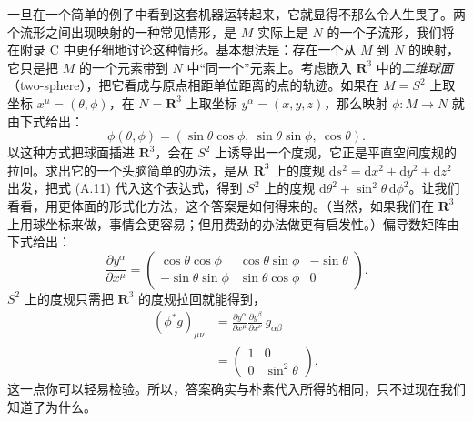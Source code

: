 
一旦在一个简单的例子中看到这套机器运转起来，它就显得不那么令人生畏了。两个流形之间出现映射的一种常见情形，是 $M$ 实际上是 $N$ 的一个子流形，我们将在附录 C 中更仔细地讨论这种情形。基本想法是：存在一个从 $M$ 到 $N$ 的映射，它只是把 $M$ 的一个元素带到 $N$ 中“同一个”元素上。考虑嵌入 $\mathbf{R}^{3}$ 中的\emph{二维球面}（two-sphere），把它看成与原点相距单位距离的点的轨迹。如果在 $M = S^{2}$ 上取坐标 $x^{\mu} = (\theta,\phi)$，在 $N = \mathbf{R}^{3}$ 上取坐标 $y^{\alpha} = (x, y, z)$，那么映射 $\phi : M \to N$ 就由下式给出：
\begin{equation*}
\phi(\theta,\phi) = (\sin\theta\cos\phi,\ \sin\theta\sin\phi,\ \cos\theta).
\tag{A.11}
\end{equation*}
以这种方式把球面插进 $\mathbf{R}^{3}$，会在 $S^{2}$ 上诱导出一个度规，它正是平直空间度规的拉回。求出它的一个头脑简单的办法，是从 $\mathbf{R}^{3}$ 上的度规 $\mathrm{d}s^{2} = \mathrm{d}x^{2} + \mathrm{d}y^{2} + \mathrm{d}z^{2}$ 出发，把式 (A.11) 代入这个表达式，得到 $S^{2}$ 上的度规 $\mathrm{d}\theta^{2} + \sin^{2}\theta\,\mathrm{d}\phi^{2}$。让我们看看，用更体面的形式化方法，这个答案是如何得来的。（当然，如果我们在 $\mathbf{R}^{3}$ 上用球坐标来做，事情会更容易；但用费劲的办法做更有启发性。）偏导数矩阵由下式给出：
\begin{equation*}
\frac{\partial y^{\alpha}}{\partial x^{\mu}} =
\begin{pmatrix}
\cos\theta\cos\phi & \cos\theta\sin\phi & -\sin\theta\\
-\sin\theta\sin\phi & \sin\theta\cos\phi & 0
\end{pmatrix}.
\tag{A.12}
\end{equation*}
$S^{2}$ 上的度规只需把 $\mathbf{R}^{3}$ 的度规拉回就能得到，
\begin{align*}
(\phi^{*}g)_{\mu\nu} &= \frac{\partial y^{\alpha}}{\partial x^{\mu}}\frac{\partial y^{\beta}}{\partial x^{\nu}}\,g_{\alpha\beta}\\
 &= \begin{pmatrix} 1 & 0\\ 0 & \sin^{2}\theta \end{pmatrix},
\tag{A.13}
\end{align*}
这一点你可以轻易检验。所以，答案确实与朴素代入所得的相同，只不过现在我们知道了为什么。
